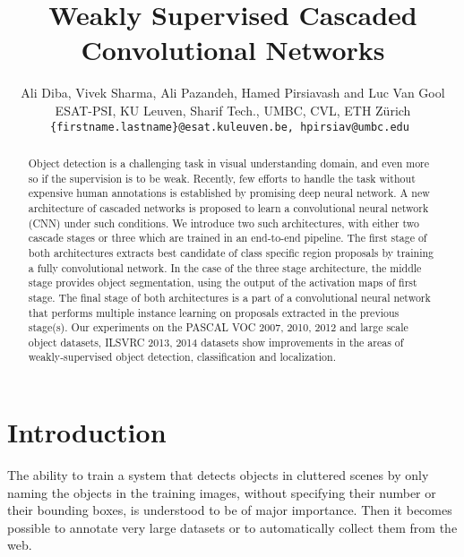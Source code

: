 \documentclass[10pt,twocolumn,letterpaper]{article}
\begin{document}
\title{Weakly Supervised Cascaded Convolutional Networks}

\author{
    {  Ali Diba,  Vivek Sharma, Ali Pazandeh, Hamed Pirsiavash and Luc Van Gool}\\
    {\normalsize {ESAT-PSI, KU Leuven, Sharif Tech., UMBC, CVL, ETH Z\"{u}rich}} \\ 
     \tt\small \{firstname.lastname\}@esat.kuleuven.be, hpirsiav@umbc.edu
 }



\maketitle


\begin{abstract}
Object detection is a challenging task in visual understanding domain, and even more so if the supervision is to be weak. Recently, few efforts to handle the task without expensive human annotations is established by promising deep neural network. A new architecture of cascaded networks is proposed to learn a convolutional neural network (CNN) under such conditions. We introduce two such architectures, with either two cascade stages or three which are trained in an end-to-end pipeline. The first stage of both architectures extracts best candidate of class specific region proposals by training a fully convolutional network. In the case of the three stage architecture, the middle stage provides object segmentation, using the output of the activation maps of first stage. The final stage of both architectures is a part of a convolutional neural network that performs multiple instance learning on proposals extracted in the previous stage(s). Our experiments on the PASCAL VOC 2007, 2010, 2012 and large scale object datasets, ILSVRC 2013, 2014 datasets show improvements in the areas of weakly-supervised object detection, classification and localization.  

\end{abstract}

\section{Introduction}
The ability to train a system that detects objects in cluttered scenes by only naming the objects in the training images, without specifying their number or their bounding boxes, is understood to be of major importance. Then it becomes possible to annotate very large datasets or to automatically collect them from the web. 
\end{document}
